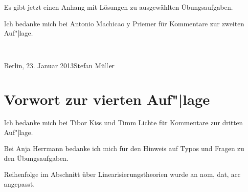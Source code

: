 Es gibt jetzt einen Anhang mit Lösungen zu ausgewählten Übungsaufgaben.

Ich bedanke mich bei Antonio Machicao y Priemer für Kommentare zur zweiten Auf"|lage.

~\medskip

\noindent
Berlin, 23. Januar 2013\hfill Stefan Müller


\section*{Vorwort zur vierten Auf"|lage}

Ich bedanke mich bei Tibor Kiss und Timm Lichte für Kommentare zur dritten Auf"|lage.

Bei Anja Herrmann bedanke ich mich für den Hinweis auf Typos und Fragen zu den Übungsaufgaben.

%





Reihenfolge im Abschnitt über Linearisierungstheorien wurde an nom, dat, acc angepasst.

%


